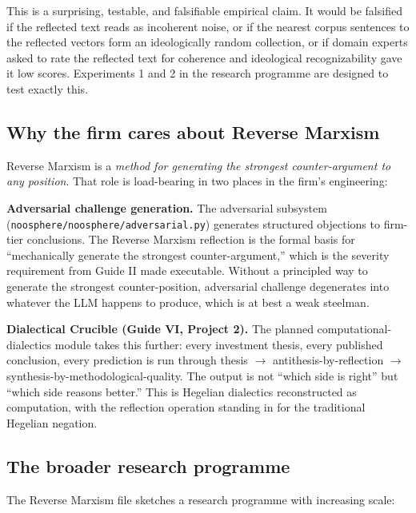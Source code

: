\documentclass[11pt,letterpaper]{article}
\newcommand{\file}[1]{\texttt{#1}}
\begin{document}
This is a surprising, testable, and falsifiable empirical claim. It would be falsified if the reflected text reads as incoherent noise, or if the nearest corpus sentences to the reflected vectors form an ideologically random collection, or if domain experts asked to rate the reflected text for coherence and ideological recognizability gave it low scores. Experiments 1 and 2 in the research programme are designed to test exactly this.

\subsection{Why the firm cares about Reverse Marxism}

Reverse Marxism is a \emph{method for generating the strongest counter-argument to any position}. That role is load-bearing in two places in the firm's engineering:

\textbf{Adversarial challenge generation.} The adversarial subsystem (\file{noosphere/noosphere/adversarial.py}) generates structured objections to firm-tier conclusions. The Reverse Marxism reflection is the formal basis for ``mechanically generate the strongest counter-argument,'' which is the severity requirement from Guide II made executable. Without a principled way to generate the strongest counter-position, adversarial challenge degenerates into whatever the LLM happens to produce, which is at best a weak steelman.

\textbf{Dialectical Crucible (Guide VI, Project 2).} The planned computational-dialectics module takes this further: every investment thesis, every published conclusion, every prediction is run through thesis $\to$ antithesis-by-reflection $\to$ synthesis-by-methodological-quality. The output is not ``which side is right'' but ``which side reasons better.'' This is Hegelian dialectics reconstructed as computation, with the reflection operation standing in for the traditional Hegelian negation.

\subsection{The broader research programme}

The Reverse Marxism file sketches a research programme with increasing scale:
\end{document}
